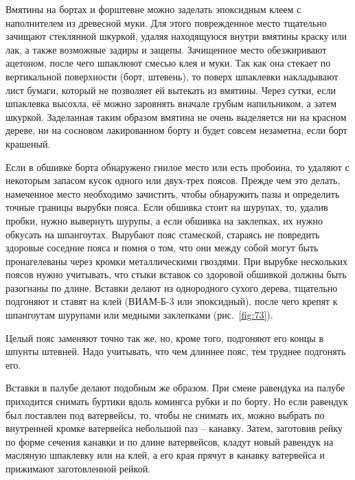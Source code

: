 \documentclass[a4paper, 12pt, twoside, final]{scrbook}
\begin{document}
Вмятины на бортах и форштевне можно заделать эпоксидным клеем с наполнителем из древесной муки. Для этого поврежденное место тщательно зачищают стеклянной шкуркой, удаляя находящуюся внутри вмятины краску или лак, а также возможные задиры и защепы. Зачищенное место обезжиривают ацетоном, после чего шпаклюют смесью клея и муки. Так как она стекает по вертикальной поверхности (борт, штевень), то поверх шпаклевки накладывают лист бумаги, который не позволяет ей вытекать из вмятины. Через сутки, если шпаклевка высохла, её можно заровнять вначале грубым напильником, а затем шкуркой. Заделанная таким образом вмятина не очень выделяется ни на красном дереве, ни на сосновом лакированном борту и будет совсем незаметна, если борт крашеный.

Если в обшивке борта обнаружено гнилое место или есть пробоина, то удаляют с некоторым запасом кусок одного или двух-трех поясов. Прежде чем это делать, намеченное место необходимо зачистить, чтобы обнаружить пазы и определить точные границы вырубки пояса. Если обшивка стоит на шурупах, то, удалив пробки, нужно вывернуть шурупы, а если обшивка на заклепках, их нужно обкусать на шпангоутах. Вырубают пояс стамеской, стараясь не повредить здоровые соседние пояса и помня о том, что они между собой могут быть пронагелеваны через кромки металлическими гвоздями. При вырубке нескольких поясов нужно учитывать, что стыки вставок со здоровой обшивкой должны быть разогнаны по длине. Вставки делают из однородного сухого дерева, тщательно подгоняют и ставят на клей (ВИАМ-Б-3 или эпоксидный), после чего крепят к шпангоутам шурупами или медными заклепками (рис.~\ref{fig:73}).

Целый пояс заменяют точно так же, но, кроме того, подгоняют его концы в шпунты штевней. Надо учитывать, что чем длиннее пояс, тем труднее подгонять его.

Вставки в палубе делают подобным же образом. При смене равендука на палубе приходится снимать буртики вдоль комингса рубки и по борту. Но если равендук был поставлен под ватервейсы, то, чтобы не снимать их, можно выбрать по внутренней кромке ватервейса небольшой паз \--- канавку. Затем, заготовив рейку по форме сечения канавки и по длине ватервейсов, кладут новый равендук на масляную шпаклевку или на клей, а его края прячут в канавку ватервейса и прижимают заготовленной рейкой.
\end{document}
